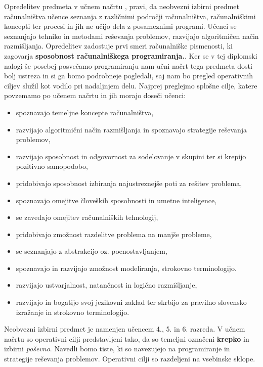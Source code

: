 Opredelitev predmeta v učnem načrtu
\cite{ucni_nacrt-neobvezni-izbirni-os}, pravi, da neobvezni izbirni
predmet računalništva učence seznanja z različnimi področji
računalništva, računalniškimi koncepti ter procesi in jih ne učijo
dela z posameznimi programi. Učenci se seznanjajo tehniko in metodami
reševanja problemov, razvijajo algoritmičen način
razmišljanja. Opredelitev zadostuje prvi smeri računalniške
pismenosti, ki zagovarja \textbf{sposobnost računalniškega
  programiranja.}. Ker se v tej diplomski nalogi še posebej posvečamo
programiranju nam učni načrt tega predmeta dosti bolj ustreza in si ga
bomo podrobneje pogledali, saj nam bo pregled operativnih ciljev
služil kot vodilo pri nadaljnjem delu.  Najprej preglejmo splošne
cilje, katere povzemamo po učenem načrtu
\cite{ucni_nacrt-neobvezni-izbirni-os} in jih morajo doseči učenci:
\begin{itemize}
\tightlist
\item spoznavajo temeljne koncepte računalništva,
\item razvijajo algoritmični način razmišljanja in spoznavajo
  strategije reševanja problemov,
\item razvijajo sposobnost in odgovornost za sodelovanje v skupini ter
  si krepijo pozitivno samopodobo,
\item pridobivajo sposobnost izbiranja najustreznejše poti za rešitev
  problema,
\item  spoznavajo omejitve človeških sposobnosti in umetne
  inteligence,
\item se zavedajo omejitev računalniških tehnologij,
\item pridobivajo zmožnost razdelitve problema na manjše probleme,
\item se seznanjajo z abstrakcijo oz. poenostavljanjem,
\item spoznavajo in razvijajo zmožnost modeliranja, strokovno
  terminologijo.
\item  razvijajo ustvarjalnost, natančnost in logično razmišljanje,
\item razvijajo in bogatijo svoj jezikovni zaklad ter skrbijo za
  pravilno slovensko izražanje in strokovno terminologijo.
\end{itemize}

Neobvezni izbirni predmet je namenjen učencem 4., 5. in 6. razreda. V
učnem načrtu so operativni cilji predstavljeni tako, da so temeljni
označeni \textbf{krepko} in izbirni \emph{poševno}. Navedli bomo
tiste, ki so navezujejo na programiranje in strategije reševanja
problemov. Operativni cilji so razdeljeni na vsebinske sklope.

